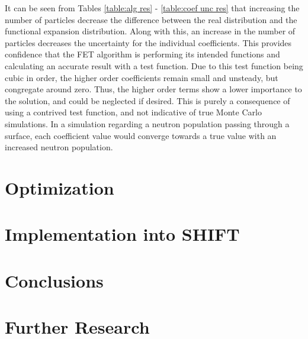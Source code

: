 \documentclass[10tma4paper]{article}
\begin{document}
It can be seen from Tables \ref{table:alg res} - \ref{table:coef unc res} that increasing the number of particles decrease the difference between the real distribution and the functional expansion distribution. Along with this, an increase in the number of particles decreases the uncertainty for the individual coefficients. This provides confidence that the FET algorithm is performing its intended functions and calculating an accurate result with a test function. Due to this test function being cubic in order, the higher order coefficients remain small and unsteady, but congregate around zero. Thus, the higher order terms show a lower importance to the solution, and could be neglected if desired. This is purely a consequence of using a contrived test function, and not indicative of true Monte Carlo simulations. In a simulation regarding a neutron population passing through a surface, each coefficient value would converge towards a true value with an increased neutron population.

\section{Optimization}\label{optimization}

\section{Implementation into SHIFT}\label{shift}

\section{Conclusions}\label{conclusion}

\section{Further Research}\label{further}
\end{document}
